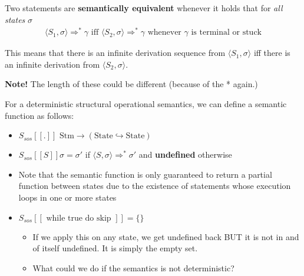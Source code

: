 \documentclass[11pt,a4paper,headsepline,titlepage,dvipsnames,cmyk]{scrartcl}
\newcommand\pfun{\hookrightarrow}
\begin{document}
Two statements are \textbf{semantically equivalent} whenever it holds that
for \textit{all states} $\sigma$
\begin{align*}
    \langle S_1, \sigma \rangle \Rightarrow^* \gamma \text{ iff } \langle
    S_2, \sigma \rangle
    \Rightarrow^* \gamma \text{ whenever } \gamma \text{ is terminal or
stuck} 
\end{align*}

This means that there is an infinite derivation sequence from $\langle S_1,
\sigma \rangle$ iff there is an infinite derivation from $\langle S_2,
\sigma \rangle$.

\textbf{Note!} The length of these could be different (because of the *
again.)

For a deterministic structural operational semantics, we can define a
semantic function as follows:
\begin{itemize}
    \item $S_{sos} [[.]] \text{ Stm} \rightarrow (\text{State} \pfun
        \text{State})$
    \item $S_{sos} [[S]] \sigma = \sigma'$ if $\langle S, \sigma \rangle
        \Rightarrow^* \sigma'$ and \textbf{undefined} otherwise
    \item Note that the semantic function is only guaranteed to return a
        partial function between states due to the existence of statements
        whose execution loops in one or more states
    \item $S_{sos} [[\text{ while true do skip }]] = \{\}$
    \begin{itemize}
        \item If we apply this on any state, we get undefined back BUT it
            is not in and of itself undefined. It is simply the empty set.
        \item What could we do if the semantics is not deterministic?
\end{itemize}
\end{itemize}
\end{document}
